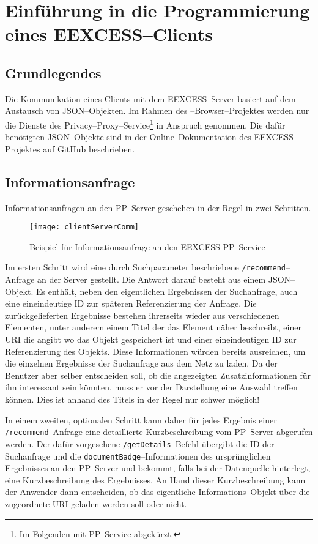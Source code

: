 \chapter{Einführung in die Programmierung eines EEXCESS--Clients}
\section{Grundlegendes}
Die Kommunikation eines Clients mit dem EEXCESS--Server basiert auf
dem Austausch von JSON--Objekten. Im Rahmen des
\SECH--Browser--Projektes werden nur die Dienste des
Privacy--Proxy--Service\footnote{Im Folgenden mit PP--Service
  abgekürzt.}  in Anspruch genommen. Die dafür benötigten
JSON--Objekte sind in der Online--Dokumentation des EEXCESS--Projektes
auf GitHub beschrieben.

\section{Informationsanfrage}
Informationsanfragen an den PP--Server geschehen in der Regel in zwei
Schritten.

\begin{figure}[ht]
    \centering
    \texttt{[image: clientServerComm]}
    \caption{Beispiel für Informationsanfrage an den EEXCESS PP--Service}
    \label{fig:clientServerEEXCESS}
\end{figure}

Im ersten Schritt wird eine durch Suchparameter beschriebene
\Verb|/recommend|--Anfrage an der Server gestellt. Die Antwort darauf
besteht aus einem JSON--Objekt. Es enthält, neben den eigentlichen
Ergebnissen der Suchanfrage, auch eine eineindeutige ID zur späteren
Referenzierung der Anfrage. Die zurückgelieferten Ergebnisse bestehen
ihrerseits wieder aus verschiedenen Elementen, unter anderem einem
Titel der das Element näher beschreibt, einer URI die angibt wo das
Objekt gespeichert ist und einer eineindeutigen ID zur Referenzierung
des Objekts. Diese Informationen würden bereits ausreichen, um die einzelnen
Ergebnisse der Suchanfrage aus dem Netz zu laden. Da der Benutzer aber
selber entscheiden soll, ob die angezeigten Zusatzinformationen für
ihn interessant sein könnten, muss er vor der Darstellung eine Auswahl
treffen können. Dies ist anhand des Titels in der Regel nur schwer
möglich!

In einem zweiten, optionalen Schritt kann daher für jedes Ergebnis
einer \Verb|/recommend|--Anfrage eine detaillierte Kurzbeschreibung
vom PP--Server abgerufen werden. Der dafür vorgesehene
\Verb|/getDetails|--Befehl übergibt die ID der Suchanfrage und die
\Verb|documentBadge|--Informationen des ursprünglichen Ergebnisses an
den PP--Server und bekommt, falls bei der Datenquelle hinterlegt, eine
Kurzbeschreibung des Ergebnisses. An Hand dieser Kurzbeschreibung kann
der Anwender dann entscheiden, ob das eigentliche Informations--Objekt
über die zugeordnete URI geladen werden soll oder nicht.

